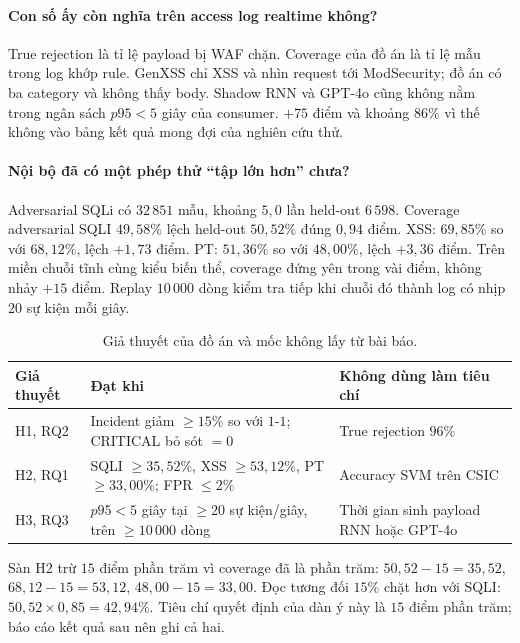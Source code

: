 \documentclass[a4paper,11pt]{article}
\begin{document}
\paragraph{Con số ấy còn nghĩa trên access log realtime không?}
True rejection là tỉ lệ payload bị WAF chặn. Coverage của đồ án là tỉ lệ mẫu trong log khớp rule. GenXSS chỉ XSS và nhìn request tới ModSecurity; đồ án có ba category và không thấy body. Shadow RNN và GPT-4o cũng không nằm trong ngân sách $p95 < 5$ giây của consumer. $+75$ điểm và khoảng $86\%$ vì thế không vào bảng kết quả mong đợi của nghiên cứu thử.

\paragraph{Nội bộ đã có một phép thử ``tập lớn hơn'' chưa?}
Adversarial SQLi có $32\,851$ mẫu, khoảng $5{,}0$ lần held-out $6\,598$. Coverage adversarial SQLI $49{,}58\%$ lệch held-out $50{,}52\%$ đúng $0{,}94$ điểm. XSS: $69{,}85\%$ so với $68{,}12\%$, lệch $+1{,}73$ điểm. PT: $51{,}36\%$ so với $48{,}00\%$, lệch $+3{,}36$ điểm. Trên miền chuỗi tĩnh cùng kiểu biến thể, coverage đứng yên trong vài điểm, không nhảy $+15$ điểm. Replay $10\,000$ dòng kiểm tra tiếp khi chuỗi đó thành log có nhịp $20$ sự kiện mỗi giây.

\begin{table}[ht]
\centering
\caption{Giả thuyết của đồ án và mốc không lấy từ bài báo.}
\label{tab:hyp}
\small
\begin{tabularx}{\linewidth}{@{}p{1.6cm}Y Y@{}}
\toprule
Giả thuyết & Đạt khi & Không dùng làm tiêu chí \\
\midrule
H1, RQ2 & Incident giảm $\geq 15\%$ so với $1$-$1$; CRITICAL bỏ sót $= 0$ & True rejection $96\%$ \\
H2, RQ1 & SQLI $\geq 35{,}52\%$, XSS $\geq 53{,}12\%$, PT $\geq 33{,}00\%$; FPR $\leq 2\%$ & Accuracy SVM trên CSIC \\
H3, RQ3 & $p95 < 5$ giây tại $\geq 20$ sự kiện/giây, trên $\geq 10\,000$ dòng & Thời gian sinh payload RNN hoặc GPT-4o \\
\bottomrule
\end{tabularx}
\end{table}

Sàn H2 trừ $15$ điểm phần trăm vì coverage đã là phần trăm: $50{,}52-15 = 35{,}52$, $68{,}12-15 = 53{,}12$, $48{,}00-15 = 33{,}00$. Đọc tương đối $15\%$ chặt hơn với SQLI: $50{,}52 \times 0{,}85 = 42{,}94\%$. Tiêu chí quyết định của dàn ý này là $15$ điểm phần trăm; báo cáo kết quả sau nên ghi cả hai.
\end{document}

